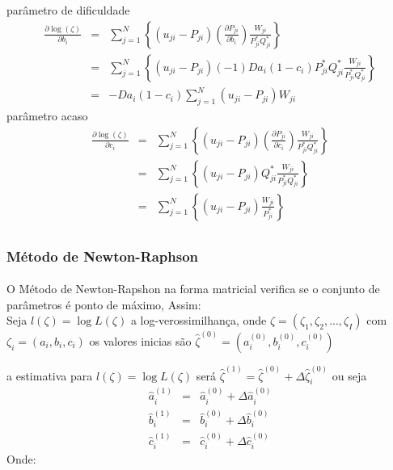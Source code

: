 	parâmetro de dificuldade\\
	
	\begin{eqnarray}
		\displaystyle\frac{\partial \log(\zeta)}{\partial b_i} & = & \sum_{j = 1}^{N}\left\{
		(u_{ji} - P_{ji})\left(\displaystyle\frac{\partial P_{ji}}{\partial b_i}\right)\displaystyle\frac{W_{ji}}{P_{ji}^{*}Q_{ji}^{*}}
		\right\}\\
		&=& \sum_{j = 1}^{N}\left\{	
		(u_{ji} - P_{ji})(-1)Da_{i}(1 - c_i)P_{ji}^{*}Q_{ji}^{*}\displaystyle\frac{W_{ji}}{P_{ji}^{*}Q_{ji}^{*}}
		\right\}\\
		& = & -Da_{i}(1 - c_i)\sum_{j = 1}^{N}(u_{ji} - P_{ji})W_{ji}
	\end{eqnarray}		
	parâmetro acaso\\
	\begin{eqnarray}
		\displaystyle\frac{\partial \log(\zeta)}{\partial c_i} & = & \sum_{j = 1}^{N}\left\{
		(u_{ji} - P_{ji})\left(\displaystyle\frac{\partial P_{ji}}{\partial c_i}\right)\displaystyle\frac{W_{ji}}{P_{ji}^{*}Q_{ji}^{*}}
		\right\}\\
		&=& \sum_{j = 1}^{N}\left\{	
		(u_{ji} - P_{ji})Q_{ji}^{*}\displaystyle\frac{W_{ji}}{P_{ji}^{*}Q_{ji}^{*}}
		\right\}\\
		&=& \sum_{j = 1}^{N}\left\{	
		(u_{ji} - P_{ji})\displaystyle\frac{W_{ji}}{P_{ji}^{*}}
		\right\}\\
	\end{eqnarray}
	\subsubsection{Método de Newton-Raphson}
	\paragraph{}
        O Método de Newton-Rapshon na forma matricial verifica se o conjunto de parâmetros é ponto de máximo, Assim:\\
	    Seja $l(\zeta) = \log L(\zeta)$ a log-verossimilhança, onde $\zeta = (\zeta_1,\zeta_2,...,\zeta_I)$ com $\zeta_i = (a_i,b_i,c_i)$
	    os valores inicias são $\hat{\zeta}^{(0)} = (a_i^{(0)},b_i^{(0)},c_i^{(0)})$
	
    	a estimativa para $l(\zeta) = \log L(\zeta)$ será 
	    $\hat{\zeta}^{(1)} = \hat{\zeta}^{(0)} + \Delta\hat{\zeta}_i^{(0)}$
	    ou seja\\
	\begin{eqnarray}
		\hat{a}_i^{(1)} & = & \hat{a}_i^{(0)} + \Delta\hat{a}_i^{(0)}\\
		\hat{b}_i^{(1)} & = & \hat{b}_i^{(0)} + \Delta\hat{b}_i^{(0)}\\
		\hat{c}_i^{(1)} & = & \hat{c}_i^{(0)} + \Delta\hat{c}_i^{(0)}
	\end{eqnarray}
	Onde:\\
	
